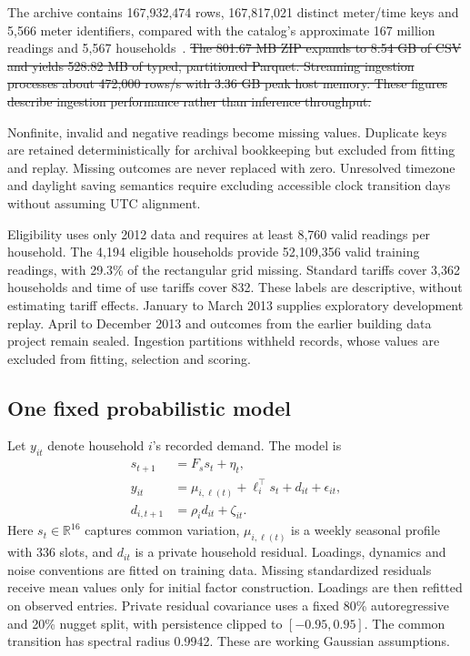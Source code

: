 \documentclass[conference]{IEEEtran}
\newcommand{\R}{\mathbb{R}}
\providecommand{\DIFdeltex}[1]{{\protect\color{red}\sout{#1}}}                      %
\providecommand{\DIFdelbegin}{} %
\providecommand{\DIFdelend}{} %
\providecommand{\DIFdel}[1]{\texorpdfstring{\DIFdeltex{#1}}{}} %
\begin{document}
The archive contains 167,932,474 rows, 167,817,021 distinct meter/time keys and 5,566 meter identifiers, compared with the catalog's approximate 167 million readings and 5,567 households~\cite{london}.
\DIFdelbegin \DIFdel{The 801.67 MB ZIP expands to 8.54 GB of CSV and yields 528.82 MB of typed, partitioned Parquet. Streaming ingestion processes about 472,000 rows/s with 3.36 GB peak host memory. These figures describe ingestion performance rather than inference throughput.
}\DIFdelend 

Nonfinite, invalid and negative readings become missing values. Duplicate keys are retained deterministically for archival bookkeeping but excluded from fitting and replay. Missing outcomes are never replaced with zero. Unresolved timezone and daylight saving semantics require excluding accessible clock transition days without assuming UTC alignment.

Eligibility uses only 2012 data and requires at least 8,760 valid readings per household. The 4,194 eligible households provide 52,109,356 valid training readings, with 29.3\% of the rectangular grid missing. Standard tariffs cover 3,362 households and time of use tariffs cover 832. These labels are descriptive, without estimating tariff effects. January to March 2013 supplies exploratory development replay. April to December 2013 and outcomes from the earlier building data project remain sealed. Ingestion partitions withheld records, whose values are excluded from fitting, selection and scoring.

\subsection{One fixed probabilistic model}
Let $y_{it}$ denote household $i$'s recorded demand. The model is
\begin{align}
 s_{t+1}&=F_s s_t+\eta_t,\\
 y_{it}&=\mu_{i,\ell(t)}+\ell_i^\top s_t+d_{it}+\epsilon_{it},\label{eq:model}\\
 d_{i,t+1}&=\rho_i d_{it}+\zeta_{it}.
\end{align}
Here $s_t\in\R^{16}$ captures common variation, $\mu_{i,\ell(t)}$ is a weekly seasonal profile with 336 slots, and $d_{it}$ is a private household residual. Loadings, dynamics and noise conventions are fitted on training data. Missing standardized residuals receive mean values only for initial factor construction. Loadings are then refitted on observed entries. Private residual covariance uses a fixed 80\% autoregressive and 20\% nugget split, with persistence clipped to $[-0.95,0.95]$. The common transition has spectral radius 0.9942. These are working Gaussian assumptions.
\end{document}
